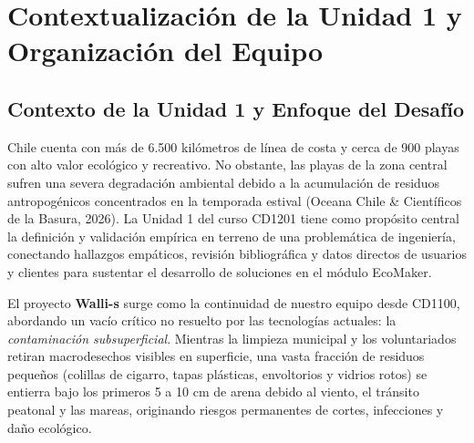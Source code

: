 \documentclass[12pt,letterpaper]{article}
\begin{document}
\clearpage
{}
\setcounter{page}{2}

\section{Contextualización de la Unidad 1 y Organización del Equipo}

\subsection{Contexto de la Unidad 1 y Enfoque del Desafío}
Chile cuenta con más de 6.500 kilómetros de línea de costa y cerca de 900 playas con alto valor ecológico y recreativo. No obstante, las playas de la zona central sufren una severa degradación ambiental debido a la acumulación de residuos antropogénicos concentrados en la temporada estival (Oceana Chile \& Científicos de la Basura, 2026). La Unidad 1 del curso CD1201 tiene como propósito central la definición y validación empírica en terreno de una problemática de ingeniería, conectando hallazgos empáticos, revisión bibliográfica y datos directos de usuarios y clientes para sustentar el desarrollo de soluciones en el módulo EcoMaker.

El proyecto \textbf{Walli-s} surge como la continuidad de nuestro equipo desde CD1100, abordando un vacío crítico no resuelto por las tecnologías actuales: la \textit{contaminación subsuperficial}. Mientras la limpieza municipal y los voluntariados retiran macrodesechos visibles en superficie, una vasta fracción de residuos pequeños (colillas de cigarro, tapas plásticas, envoltorios y vidrios rotos) se entierra bajo los primeros 5 a 10 cm de arena debido al viento, el tránsito peatonal y las mareas, originando riesgos permanentes de cortes, infecciones y daño ecológico.
\end{document}
